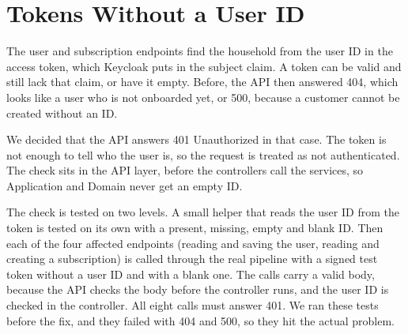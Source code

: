 \documentclass[a4paper,11pt]{article}
\begin{document}
\section{Tokens Without a User ID}
The user and subscription endpoints find the household from the user ID in the access token, which Keycloak puts in the subject claim. A token can be valid and still lack that claim, or have it empty. Before, the API then answered 404, which looks like a user who is not onboarded yet, or 500, because a customer cannot be created without an ID.

We decided that the API answers 401 Unauthorized in that case. The token is not enough to tell who the user is, so the request is treated as not authenticated. The check sits in the API layer, before the controllers call the services, so Application and Domain never get an empty ID.

The check is tested on two levels. A small helper that reads the user ID from the token is tested on its own with a present, missing, empty and blank ID. Then each of the four affected endpoints (reading and saving the user, reading and creating a subscription) is called through the real pipeline with a signed test token without a user ID and with a blank one. The calls carry a valid body, because the API checks the body before the controller runs, and the user ID is checked in the controller. All eight calls must answer 401. We ran these tests before the fix, and they failed with 404 and 500, so they hit the actual problem.
\end{document}
